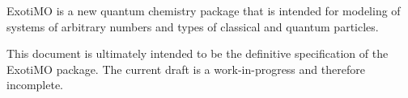 \label{Scope}

ExotiMO is a new quantum chemistry package that is intended
for modeling of systems of arbitrary numbers and types of 
classical and quantum particles.

This document is ultimately intended to be the definitive
specification of the ExotiMO package.  The current draft is a
work-in-progress and therefore incomplete.

